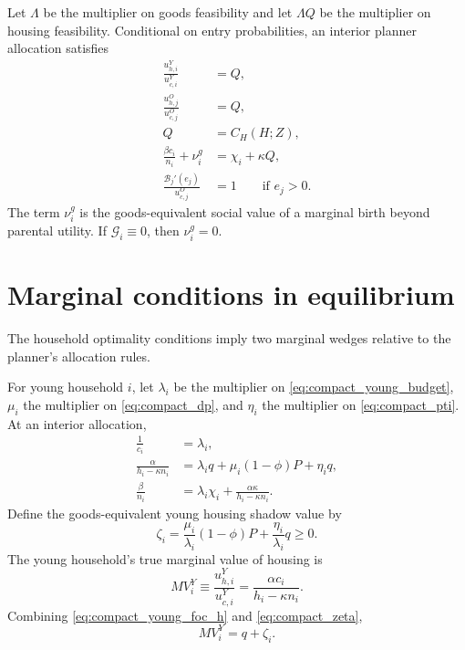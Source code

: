 \documentclass[11pt]{article}
\newcommand{\1}{\mathbf 1}
\begin{document}
Let $\Lambda$ be the multiplier on goods feasibility and let $\Lambda Q$ be the multiplier on housing feasibility. Conditional on entry probabilities, an interior planner allocation satisfies
\begin{align}
\frac{u^Y_{h,i}}{u^Y_{c,i}}&=Q,
\label{eq:compact_planner_young_housing}\\
\frac{u^O_{h,j}}{u^O_{c,j}}&=Q,
\label{eq:compact_planner_old_housing}\\
Q&=C_H(H;Z),
\label{eq:compact_planner_supply}\\
\frac{\beta c_i}{n_i}+\nu_i^g&=\chi_i+\kappa Q,
\label{eq:compact_planner_fertility}\\
\frac{\mathcal B_j'(e_j)}{u^O_{c,j}}&=1
\qquad \text{if }e_j>0.
\label{eq:compact_planner_bequest}
\end{align}
The term $\nu_i^g$ is the goods-equivalent social value of a marginal birth beyond parental utility. If $\mathcal G_i\equiv0$, then $\nu_i^g=0$.

\section{Marginal conditions in equilibrium}

The household optimality conditions imply two marginal wedges relative to the planner's allocation rules.

For young household $i$, let $\lambda_i$ be the multiplier on \eqref{eq:compact_young_budget}, $\mu_i$ the multiplier on \eqref{eq:compact_dp}, and $\eta_i$ the multiplier on \eqref{eq:compact_pti}. At an interior allocation,
\begin{align}
\frac{1}{c_i}&=\lambda_i,
\label{eq:compact_young_foc_c}\\
\frac{\alpha}{h_i-\kappa n_i}
&=
\lambda_i q+\mu_i(1-\phi)P+\eta_i q,
\label{eq:compact_young_foc_h}\\
\frac{\beta}{n_i}
&=
\lambda_i\chi_i+
\frac{\alpha\kappa}{h_i-\kappa n_i}.
\label{eq:compact_young_foc_n}
\end{align}
Define the goods-equivalent young housing shadow value by
\begin{equation}
\zeta_i
=
\frac{\mu_i}{\lambda_i}(1-\phi)P
+
\frac{\eta_i}{\lambda_i}q
\ge0.
\label{eq:compact_zeta}
\end{equation}
The young household's true marginal value of housing is
\begin{equation}
MV_i^Y
\equiv
\frac{u^Y_{h,i}}{u^Y_{c,i}}
=
\frac{\alpha c_i}{h_i-\kappa n_i}.
\label{eq:compact_mv_y}
\end{equation}
Combining \eqref{eq:compact_young_foc_h} and \eqref{eq:compact_zeta},
\begin{equation}
MV_i^Y=q+\zeta_i.
\label{eq:compact_young_wedge}
\end{equation}
\end{document}
